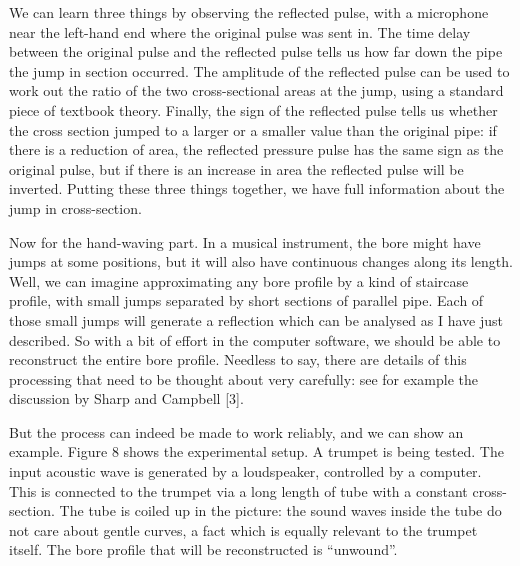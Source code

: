   We can learn three things by observing the reflected pulse, with a microphone 
  near the left-hand end where the original pulse was sent in. The time delay 
  between the original pulse and the reflected pulse tells us how far down the 
  pipe the jump in section occurred. The amplitude of the reflected pulse can 
  be used to work out the ratio of the two cross-sectional areas at the jump, 
  using a standard piece of textbook theory. Finally, the sign of the reflected 
  pulse tells us whether the cross section jumped to a larger or a smaller 
  value than the original pipe: if there is a reduction of area, the reflected 
  pressure pulse has the same sign as the original pulse, but if there is an 
  increase in area the reflected pulse will be inverted. Putting these three 
  things together, we have full information about the jump in cross-section. 

  Now for the hand-waving part. In a musical instrument, the bore might have 
  jumps at some positions, but it will also have continuous changes along its 
  length. Well, we can imagine approximating any bore profile by a kind of 
  staircase profile, with small jumps separated by short sections of parallel 
  pipe. Each of those small jumps will generate a reflection which can be 
  analysed as I have just described. So with a bit of effort in the computer 
  software, we should be able to reconstruct the entire bore profile. Needless 
  to say, there are details of this processing that need to be thought about 
  very carefully: see for example the discussion by Sharp and Campbell [3]. 

  But the process can indeed be made to work reliably, and we can show an 
  example. Figure 8 shows the experimental setup. A trumpet is being tested. 
  The input acoustic wave is generated by a loudspeaker, controlled by a 
  computer. This is connected to the trumpet via a long length of tube with a 
  constant cross-section. The tube is coiled up in the picture: the sound waves 
  inside the tube do not care about gentle curves, a fact which is equally 
  relevant to the trumpet itself. The bore profile that will be reconstructed 
  is “unwound”. 


